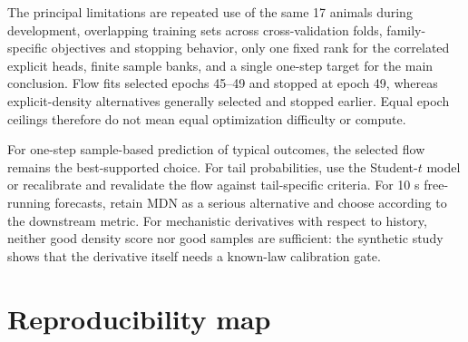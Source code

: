 \documentclass[11pt]{article}
\begin{document}
The principal limitations are repeated use of the same 17 animals during development, overlapping training sets across cross-validation folds, family-specific objectives and stopping behavior, only one fixed rank for the correlated explicit heads, finite sample banks, and a single one-step target for the main conclusion. Flow fits selected epochs 45--49 and stopped at epoch 49, whereas explicit-density alternatives generally selected and stopped earlier. Equal epoch ceilings therefore do not mean equal optimization difficulty or compute.

For one-step sample-based prediction of typical outcomes, the selected flow remains the best-supported choice. For tail probabilities, use the Student-$t$ model or recalibrate and revalidate the flow against tail-specific criteria. For 10 s free-running forecasts, retain MDN as a serious alternative and choose according to the downstream metric. For mechanistic derivatives with respect to history, neither good density score nor good samples are sufficient: the synthetic study shows that the derivative itself needs a known-law calibration gate.

\appendix
\section{Reproducibility map}
\end{document}
